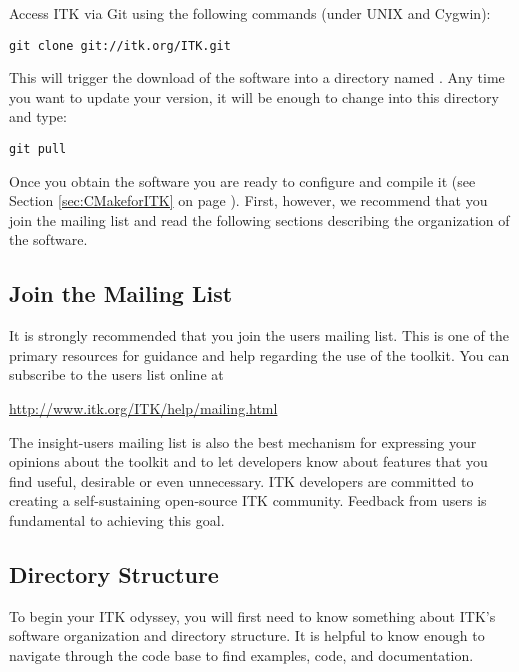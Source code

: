 Access ITK via Git using the following commands (under UNIX and Cygwin):
\begin{verbatim}
git clone git://itk.org/ITK.git
\end{verbatim}

This will trigger the download of the software into a directory named
.  Any time you want to update your version, it will be enough to
change into this directory  and type:
\begin{verbatim}
git pull
\end{verbatim}

Once you obtain the software you are ready to configure and compile it (see
Section \ref{sec:CMakeforITK} on page \pageref{sec:CMakeforITK}). First,
however, we recommend that you join the mailing list and read the following
sections describing the organization of the software.

\subsection{Join the Mailing List}
\label{sec:JoinMailList}


It is strongly recommended that you join the users mailing list. This is one
of the primary resources for guidance and help regarding the use of the
toolkit. You can subscribe to the users list online at

\begin{center}
\url{http://www.itk.org/ITK/help/mailing.html}
\end{center}

The insight-users mailing list is also the best mechanism for expressing your
opinions about the toolkit and to let developers know about features that you
find useful, desirable or even unnecessary. ITK developers are committed to
creating a self-sustaining open-source ITK community. Feedback from users is
fundamental to achieving this goal.

\subsection{Directory Structure}
\label{sec:DirectoryStructure}

To begin your ITK odyssey, you will first need to know something about
ITK's software organization and directory structure. It is helpful to
know enough to navigate through the code base to find examples, code,
and documentation.

